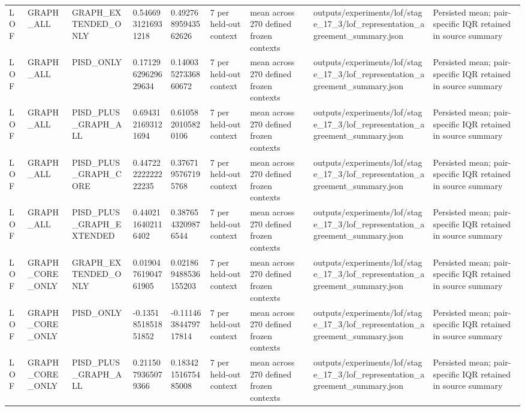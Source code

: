 \begin{longtable}{lllllllll}
LOF & GRAPH\_ALL & GRAPH\_EXTENDED\_ONLY & 0.5466931216931218 & 0.49276895943562626 & 7 per held-out context & mean across 270 defined frozen contexts & outputs/experiments/lof/stage\_17\_3/lof\_representation\_agreement\_summary.json & Persisted mean; pair-specific IQR retained in source summary \\
LOF & GRAPH\_ALL & PISD\_ONLY & 0.17129629629629634 & 0.14003527336860672 & 7 per held-out context & mean across 270 defined frozen contexts & outputs/experiments/lof/stage\_17\_3/lof\_representation\_agreement\_summary.json & Persisted mean; pair-specific IQR retained in source summary \\
LOF & GRAPH\_ALL & PISD\_PLUS\_GRAPH\_ALL & 0.6943121693121694 & 0.6105820105820106 & 7 per held-out context & mean across 270 defined frozen contexts & outputs/experiments/lof/stage\_17\_3/lof\_representation\_agreement\_summary.json & Persisted mean; pair-specific IQR retained in source summary \\
LOF & GRAPH\_ALL & PISD\_PLUS\_GRAPH\_CORE & 0.44722222222222235 & 0.3767195767195768 & 7 per held-out context & mean across 270 defined frozen contexts & outputs/experiments/lof/stage\_17\_3/lof\_representation\_agreement\_summary.json & Persisted mean; pair-specific IQR retained in source summary \\
LOF & GRAPH\_ALL & PISD\_PLUS\_GRAPH\_EXTENDED & 0.4402116402116402 & 0.3876543209876544 & 7 per held-out context & mean across 270 defined frozen contexts & outputs/experiments/lof/stage\_17\_3/lof\_representation\_agreement\_summary.json & Persisted mean; pair-specific IQR retained in source summary \\
LOF & GRAPH\_CORE\_ONLY & GRAPH\_EXTENDED\_ONLY & 0.01904761904761905 & 0.021869488536155203 & 7 per held-out context & mean across 270 defined frozen contexts & outputs/experiments/lof/stage\_17\_3/lof\_representation\_agreement\_summary.json & Persisted mean; pair-specific IQR retained in source summary \\
LOF & GRAPH\_CORE\_ONLY & PISD\_ONLY & -0.1351851851851852 & -0.11146384479717814 & 7 per held-out context & mean across 270 defined frozen contexts & outputs/experiments/lof/stage\_17\_3/lof\_representation\_agreement\_summary.json & Persisted mean; pair-specific IQR retained in source summary \\
LOF & GRAPH\_CORE\_ONLY & PISD\_PLUS\_GRAPH\_ALL & 0.2115079365079366 & 0.18342151675485008 & 7 per held-out context & mean across 270 defined frozen contexts & outputs/experiments/lof/stage\_17\_3/lof\_representation\_agreement\_summary.json & Persisted mean; pair-specific IQR retained in source summary \\

\end{longtable}
